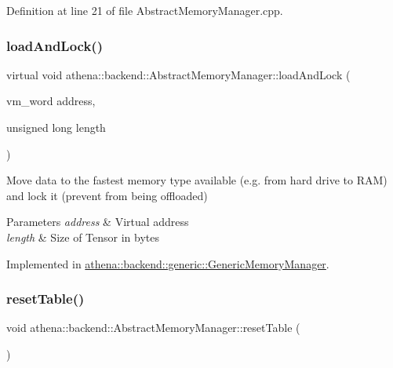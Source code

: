 Definition at line 21 of file Abstract\+Memory\+Manager.\+cpp.

\mbox{\label{classathena_1_1backend_1_1_abstract_memory_manager_a9fe52e4020802d6f526fba06adce8407}} 
\subsubsection{\texorpdfstring{load\+And\+Lock()}{loadAndLock()}\hspace{0.1cm}{\footnotesize\ttfamily [3/3]}}
{\footnotesize\ttfamily virtual void athena\+::backend\+::\+Abstract\+Memory\+Manager\+::load\+And\+Lock (\begin{DoxyParamCaption}\item[{vm\+\_\+word}]{address,  }\item[{unsigned long}]{length }\end{DoxyParamCaption})\hspace{0.3cm}{\ttfamily [pure virtual]}}

Move data to the fastest memory type available (e.\+g. from hard drive to R\+AM) and lock it (prevent from being offloaded) 
\begin{DoxyParams}{Parameters}
{\em address} & Virtual address \\
\hline
{\em length} & Size of Tensor in bytes \\
\hline
\end{DoxyParams}


Implemented in \mbox{\hyperlink{classathena_1_1backend_1_1generic_1_1_generic_memory_manager_aa7fce5a6cbd9c4f5ad1868735e4546a8}{athena\+::backend\+::generic\+::\+Generic\+Memory\+Manager}}.

\mbox{\label{classathena_1_1backend_1_1_abstract_memory_manager_a358f614d4358f5dce28f17dba6917b1f}} 
\subsubsection{\texorpdfstring{reset\+Table()}{resetTable()}}
{\footnotesize\ttfamily void athena\+::backend\+::\+Abstract\+Memory\+Manager\+::reset\+Table (\begin{DoxyParamCaption}{ }\end{DoxyParamCaption})}

